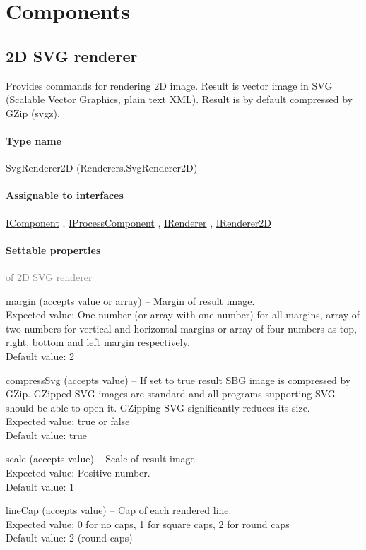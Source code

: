 


\section{Components}

	

\subsection{2D SVG renderer}
\label{Malsys.Processing.Components.Renderers.SvgRenderer2D}
Provides commands for rendering 2D image.
            Result is vector image in SVG (Scalable Vector Graphics, plain text XML).
            Result is by default compressed by GZip (svgz).\paragraph{Type name}
SvgRenderer2D (Renderers.SvgRenderer2D) 	\paragraph{Assignable to interfaces}
		\hyperref[Malsys.Processing.Components.IComponent]{IComponent}%
, 		\hyperref[Malsys.Processing.Components.IProcessComponent]{IProcessComponent}%
, 		\hyperref[Malsys.Processing.Components.IRenderer]{IRenderer}%
, 		\hyperref[Malsys.Processing.Components.Renderers.IRenderer2D]{IRenderer2D}%
	\paragraph{Settable properties}\textcolor{gray}{of 2D SVG renderer}
	\begin{description*}
		\item[margin]
		(accepts value or array)
			-- Margin of result image.
			\\ Expected value: One number (or array with one number) for all margins, array of two numbers for vertical and horizontal margins
            or array of four numbers as top, right, bottom and left margin respectively.
			\\ Default value: 2
		\item[compressSvg]
		(accepts value)
			-- If set to true result SBG image is compressed by GZip.
            GZipped SVG images are standard and all programs supporting SVG should be able to open it.
            GZipping SVG significantly reduces its size.
			\\ Expected value: true or false
			\\ Default value: true
		\item[scale]
		(accepts value)
			-- Scale of result image.
			\\ Expected value: Positive number.
			\\ Default value: 1
		\item[lineCap]
		(accepts value)
			-- Cap of each rendered line.
			\\ Expected value: 0 for no caps, 1 for square caps, 2 for round caps
			\\ Default value: 2 (round caps)
	\end{description*}
	
